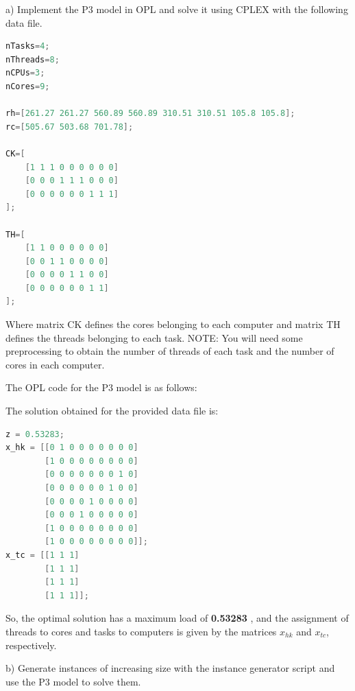 \documentclass{article}
\begin{document}
\begin{tcolorbox}[colback=gray!10, colframe=gray!50]
a) Implement the P3 model in OPL and solve it using CPLEX with the following
data file.
\vspace{0.2cm}
\begin{lstlisting}[language=Java, frame=single, xleftmargin=0pt]
nTasks=4;
nThreads=8;
nCPUs=3;
nCores=9;

rh=[261.27 261.27 560.89 560.89 310.51 310.51 105.8 105.8];
rc=[505.67 503.68 701.78];

CK=[
    [1 1 1 0 0 0 0 0 0]
    [0 0 0 1 1 1 0 0 0]
    [0 0 0 0 0 0 1 1 1]
];

TH=[
    [1 1 0 0 0 0 0 0]
    [0 0 1 1 0 0 0 0]
    [0 0 0 0 1 1 0 0]
    [0 0 0 0 0 0 1 1]
];
\end{lstlisting}

Where matrix CK defines the cores belonging to each computer and matrix TH defines the threads belonging to each task.
NOTE: You will need some preprocessing to obtain the number of threads of each task and the number of cores in each computer.

\end{tcolorbox}

The OPL code for the P3 model is as follows:



The solution obtained for the provided data file is:

\begin{lstlisting}[language=Java,frame=single]
z = 0.53283;
x_hk = [[0 1 0 0 0 0 0 0 0]
        [1 0 0 0 0 0 0 0 0]
        [0 0 0 0 0 0 0 1 0]
        [0 0 0 0 0 0 1 0 0]
        [0 0 0 0 1 0 0 0 0]
        [0 0 0 1 0 0 0 0 0]
        [1 0 0 0 0 0 0 0 0]
        [1 0 0 0 0 0 0 0 0]];
x_tc = [[1 1 1]
        [1 1 1]
        [1 1 1]
        [1 1 1]];
\end{lstlisting}

So, the optimal solution has a maximum load of \textbf{0.53283} , and the assignment of threads to cores and tasks to computers is given by the matrices $x_{hk}$ and $x_{tc}$, respectively.

\begin{tcolorbox}[colback=gray!10, colframe=gray!50]
b) Generate instances of increasing size with the instance generator script and use the P3 model to solve them.
\end{tcolorbox}
\end{document}
